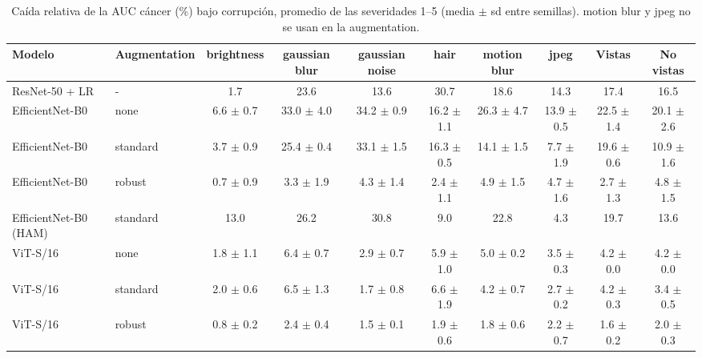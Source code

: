 \begin{table}[t]
\caption{Caída relativa de la AUC cáncer (\%) bajo corrupción, promedio de las severidades 1--5 (media $\pm$ sd entre semillas). motion blur y jpeg no se usan en la augmentation.}
\label{tab:robustness}
\centering
\begin{adjustbox}{max width=\linewidth}
\begin{tabular}{llcccccccc}
\toprule
Modelo & Augmentation & brightness & gaussian blur & gaussian noise & hair & motion blur & jpeg & Vistas & No vistas \\
\midrule
ResNet-50 + LR & - & 1.7 & 23.6 & 13.6 & 30.7 & 18.6 & 14.3 & 17.4 & 16.5 \\
EfficientNet-B0 & none & 6.6 $\pm$ 0.7 & 33.0 $\pm$ 4.0 & 34.2 $\pm$ 0.9 & 16.2 $\pm$ 1.1 & 26.3 $\pm$ 4.7 & 13.9 $\pm$ 0.5 & 22.5 $\pm$ 1.4 & 20.1 $\pm$ 2.6 \\
EfficientNet-B0 & standard & 3.7 $\pm$ 0.9 & 25.4 $\pm$ 0.4 & 33.1 $\pm$ 1.5 & 16.3 $\pm$ 0.5 & 14.1 $\pm$ 1.5 & 7.7 $\pm$ 1.9 & 19.6 $\pm$ 0.6 & 10.9 $\pm$ 1.6 \\
EfficientNet-B0 & robust & 0.7 $\pm$ 0.9 & 3.3 $\pm$ 1.9 & 4.3 $\pm$ 1.4 & 2.4 $\pm$ 1.1 & 4.9 $\pm$ 1.5 & 4.7 $\pm$ 1.6 & 2.7 $\pm$ 1.3 & 4.8 $\pm$ 1.5 \\
EfficientNet-B0 (HAM) & standard & 13.0 & 26.2 & 30.8 & 9.0 & 22.8 & 4.3 & 19.7 & 13.6 \\
ViT-S/16 & none & 1.8 $\pm$ 1.1 & 6.4 $\pm$ 0.7 & 2.9 $\pm$ 0.7 & 5.9 $\pm$ 1.0 & 5.0 $\pm$ 0.2 & 3.5 $\pm$ 0.3 & 4.2 $\pm$ 0.0 & 4.2 $\pm$ 0.0 \\
ViT-S/16 & standard & 2.0 $\pm$ 0.6 & 6.5 $\pm$ 1.3 & 1.7 $\pm$ 0.8 & 6.6 $\pm$ 1.9 & 4.2 $\pm$ 0.7 & 2.7 $\pm$ 0.2 & 4.2 $\pm$ 0.3 & 3.4 $\pm$ 0.5 \\
ViT-S/16 & robust & 0.8 $\pm$ 0.2 & 2.4 $\pm$ 0.4 & 1.5 $\pm$ 0.1 & 1.9 $\pm$ 0.6 & 1.8 $\pm$ 0.6 & 2.2 $\pm$ 0.7 & 1.6 $\pm$ 0.2 & 2.0 $\pm$ 0.3 \\
\bottomrule
\end{tabular}
\end{adjustbox}
\end{table}
